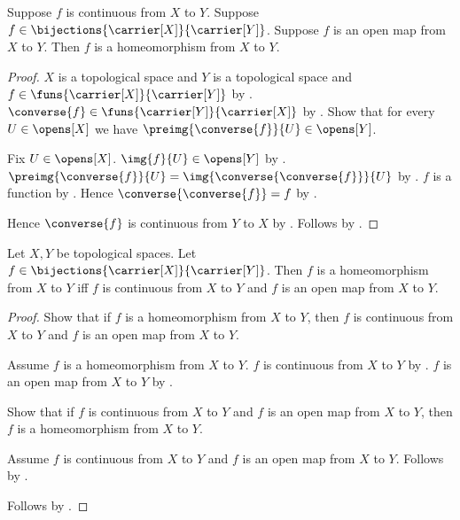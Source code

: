 \begin{theorem}\label{continuous_bijection_open_map_is_homeomorphism}
    Suppose $f$ is continuous from $X$ to $Y$.
    Suppose $f\in\bijections{\carrier[X]}{\carrier[Y]}$.
    Suppose $f$ is an open map from $X$ to $Y$.
    Then $f$ is a homeomorphism from $X$ to $Y$.
\end{theorem}
\begin{proof}
    $X$ is a topological space and $Y$ is a topological space and
        $f\in\funs{\carrier[X]}{\carrier[Y]}$ by
        .
    $\converse{f}\in\funs{\carrier[Y]}{\carrier[X]}$ by
        .
    Show that for every $U\in\opens[X]$ we have
        $\preimg{\converse{f}}{U}\in\opens[Y]$.
    \begin{subproof}
        Fix $U\in\opens[X]$.
        $\img{f}{U}\in\opens[Y]$ by .
        $\preimg{\converse{f}}{U}
            =\img{\converse{\converse{f}}}{U}$ by
            .
        $f$ is a function by .
        Hence $\converse{\converse{f}}=f$ by
            .
    \end{subproof}
    Hence $\converse{f}$ is continuous from $Y$ to $X$ by
        .
    Follows by .
\end{proof}

\begin{theorem}\label{homeomorphism_iff_continuous_bijection_open_map}
    Let $X,Y$ be topological spaces.
    Let $f\in\bijections{\carrier[X]}{\carrier[Y]}$.
    Then $f$ is a homeomorphism from $X$ to $Y$ iff
        $f$ is continuous from $X$ to $Y$ and
        $f$ is an open map from $X$ to $Y$.
\end{theorem}
\begin{proof}
    Show that if $f$ is a homeomorphism from $X$ to $Y$, then
        $f$ is continuous from $X$ to $Y$ and
        $f$ is an open map from $X$ to $Y$.
    \begin{subproof}
        Assume $f$ is a homeomorphism from $X$ to $Y$.
        $f$ is continuous from $X$ to $Y$ by .
        $f$ is an open map from $X$ to $Y$ by
            .
    \end{subproof}
    Show that if $f$ is continuous from $X$ to $Y$ and
        $f$ is an open map from $X$ to $Y$, then
        $f$ is a homeomorphism from $X$ to $Y$.
    \begin{subproof}
        Assume $f$ is continuous from $X$ to $Y$ and
            $f$ is an open map from $X$ to $Y$.
        Follows by
            .
    \end{subproof}
    Follows by \auto.
\end{proof}
